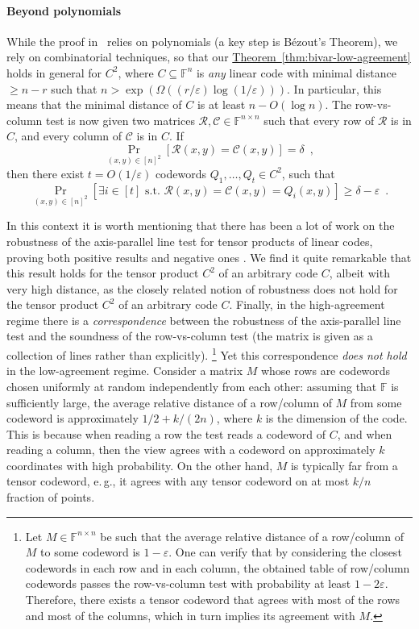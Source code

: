 \documentclass[11pt]{article}
\numberwithin{equation}{section}
\theoremstyle{definition}
\theoremstyle{plain}
\newcommand{\eg}{e.\,g.}
\newcommand{\expref}[2]{\hyperref[#2]{#1~\ref{#2}}}
\theoremstyle{plain}
\newcommand{\colored}{}
\newcommand{\blocklength}{\colored{n}} %
\newcommand{\Field}{\colored{\mathbb F}}
\newcommand{\st}{\colored{\text{ s.t. }}}
\newcommand{\degree}{\colored{r}}
\newcommand{\rowpoly}{\colored{\mathcal R}}
\newcommand{\colpoly}{\colored{\mathcal C}}
\newcommand{\prox}{\colored{\delta}}
\newcommand{\eps}{\varepsilon}
\newcommand{\parhead}{\paragraph}
\begin{document}
%
%
%
%
%
%
%
%
\parhead{Beyond polynomials}\label{par:beyondpoly}
While
%
the proof in~\cite{PolishchukS94}   %
relies on polynomials (a key step is B\'{e}zout's Theorem), we rely on combinatorial techniques, so that our \expref{Theorem}{thm:bivar-low-agreement} holds in general
%
%
for $C^2$, where $C \subseteq \Field^{\blocklength}$ is \emph{any} linear code      %
with minimal distance $\geq \blocklength-\degree$ such that $\blocklength > \exp(\Omega(({\degree}/{\eps}) \log({1}/{\eps})))$.
In particular, this means that the minimal distance of $C$ is at least $\blocklength - O(\log \blocklength)$.
The row-vs-column test is now given two matrices $\rowpoly,\colpoly \in \Field^{\blocklength \times \blocklength}$ such that every row of $\rowpoly$ is in $C$, and every column of $\colpoly$ is in $C$. If
\[
  \Pr_{(x,y) \in [\blocklength]^2}[\rowpoly(x,y) = \colpoly(x,y)] = \prox\enspace,
\]
then there exist $t = O(1/\eps)$ codewords $Q_1,\dots,Q_t \in
C^2$, %
such that
\[
  \Pr_{(x,y) \in [\blocklength]^2}[\exists i \in [t] \st \rowpoly(x,y)
  = \colpoly(x,y) = Q_i(x,y)] \geq \prox - \eps\enspace.
\]


In this context it is worth mentioning that there has been a lot of work on the robustness of the axis-parallel line test for
%
tensor products of linear codes,                                                %
proving both positive results \cite{Ben-SassonS06,DinurSW06} and negative ones \cite{Valiant05,CoppersmithR05,GoldreichM12}.
We find it quite remarkable that this result holds for
%
the tensor product $C^2$ of an arbitrary code $C$,                                          %
albeit with very high distance,
as the closely related notion of robustness does not hold for
%
the tensor product $C^2$ of an arbitrary code $C$.                                          %
Finally, in the high-agreement regime there is a \emph{correspondence} between
the robustness of the axis-parallel line test
and the soundness of the row-vs-column test (the matrix is given as a collection of lines rather than explicitly).%
\footnote{
Let $M \in \Field^{\blocklength \times \blocklength}$ be such that
the average relative distance of a row/column of $M$ to some codeword is $1-\eps$.
One can verify that by considering the closest codewords in each row and in each column,
the obtained table of row/column codewords
passes the row-vs-column test with probability at least $1-2\eps$.
Therefore, there exists a tensor codeword that agrees with most of the rows and most of the columns,
which in turn implies its agreement with $M$.}
Yet this correspondence \emph{does not hold} in the low-agreement regime. Consider a matrix $M$ whose rows are codewords chosen uniformly at random independently from each other: assuming that $\Field$ is sufficiently large, the average relative distance of a row/column of $M$ from some codeword is approximately ${1}/{2} + {k}/{(2\blocklength)}$, where $k$ is the dimension of the code. This is because when reading a row the test reads a codeword of $C$, and when reading a column, then the view agrees with a codeword on approximately $k$ coordinates with high probability.
On the other hand, $M$ is typically far from a tensor codeword, \eg, it agrees with any tensor codeword on at most $k/n$ fraction of points.
\end{document}
